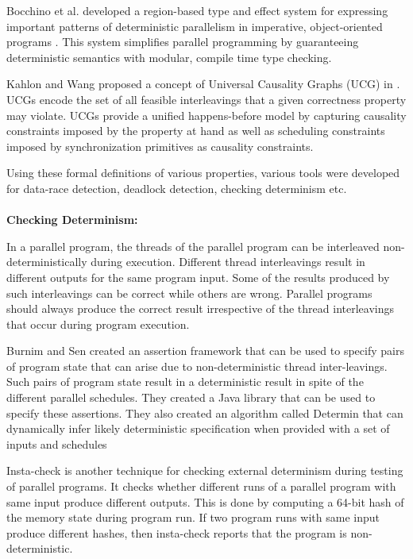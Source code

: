Bocchino et al. developed a region-based type and effect system for expressing important patterns of deterministic parallelism in imperative, object-oriented programs \cite{bocchino2009type}. This system simplifies parallel programming by guaranteeing deterministic semantics with modular, compile time type checking.

Kahlon and Wang proposed a concept of Universal Causality Graphs (UCG) in \cite{kahlon2010universal}. UCGs encode the set of all feasible interleavings that a given correctness property may violate. UCGs provide a unified happens-before model by capturing causality constraints imposed by the property at hand as well as scheduling constraints imposed by synchronization primitives as causality constraints.

Using these formal definitions of various properties, various tools were developed for data-race detection, deadlock detection, checking determinism etc.\\
\\
\textbf{Checking Determinism: }

In a parallel program, the threads of the parallel program can be interleaved non-deterministically during execution. Different thread interleavings result in different outputs for the same program input. Some of the results produced by such interleavings can be correct while others are wrong. Parallel programs should always produce the correct result irrespective of the thread interleavings that occur during program execution.

Burnim and Sen created an assertion framework that can be used to specify pairs of program state that can arise due to non-deterministic thread inter-leavings\cite{burnim2009asserting}. Such pairs of program state result in a deterministic result in spite of the different parallel schedules. They created a Java library that can be used to specify these assertions. They also created an algorithm called Determin \cite{burnim2010determin} that can dynamically infer likely deterministic specification when provided with a set of inputs and schedules

Insta-check \cite{nistor2010instantcheck} is another technique for checking external determinism during testing of parallel programs. It checks whether different runs of a parallel program with same input produce different outputs. This is done by computing a 64-bit hash of the memory state during program run. If two program runs with same input produce different hashes, then insta-check reports that the program is non-deterministic. 

